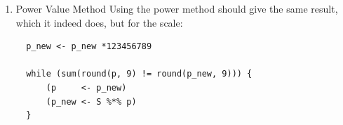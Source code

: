 \documentclass[11pt]{article}
\begin{document}
\begin{enumerate}
\begin{verbatim}
\end{verbatim}

So in this case \sout{the} a stationary point is
\(\langle -0.49, -0.53, -0.49, -0.48, -0.05, -0.05, -0.05, -0.04, -0.04, -0.04 \rangle\)

which can be verified:

$$
1 \vec{p} = S\vec{p}
$$

\begin{verbatim}
  (p     <- eigen(S)$values[1] * eigen(S)$vectors[,1])
\end{verbatim}

\begin{verbatim}
  ##  [1] -0.48531271 -0.52732002 -0.49152601 -0.47977477 -0.05288058 -0.05288058
  ##  [7] -0.05288058 -0.04558671 -0.04558671 -0.04558671
\end{verbatim}

\begin{verbatim}
  (p_new <- S %*% p)
\end{verbatim}

\begin{verbatim}
  ##           [,1]
  ## 1  -0.48531271
  ## 2  -0.52732002
  ## 3  -0.49152601
  ## 4  -0.47977477
  ## 5  -0.05288058
  ## 6  -0.05288058
  ## 7  -0.05288058
  ## 8  -0.04558671
  ## 9  -0.04558671
  ## 10 -0.04558671
\end{verbatim}

However this vector does not sum to 1 so the scale should be adjusted
(for probabilities the vector should sum to 1):

\begin{verbatim}
  (p_new <- p_new/sum(p_new))
\end{verbatim}

\begin{verbatim}
  ##         [,1]
  ## 1  0.2129185
  ## 2  0.2313481
  ## 3  0.2156444
  ## 4  0.2104889
  ## 5  0.0232000
  ## 6  0.0232000
  ## 7  0.0232000
  ## 8  0.0200000
  ## 9  0.0200000
  ## 10 0.0200000
\end{verbatim}

\item Power Value Method
\label{sec:org1043859}
Using the power method should give the same result, which it indeed
does, but for the scale:

\begin{verbatim}
  p_new <- p_new *123456789

  while (sum(round(p, 9) != round(p_new, 9))) {
      (p     <- p_new)
      (p_new <- S %*% p)
  }


\end{verbatim}
\end{enumerate}
\end{document}
